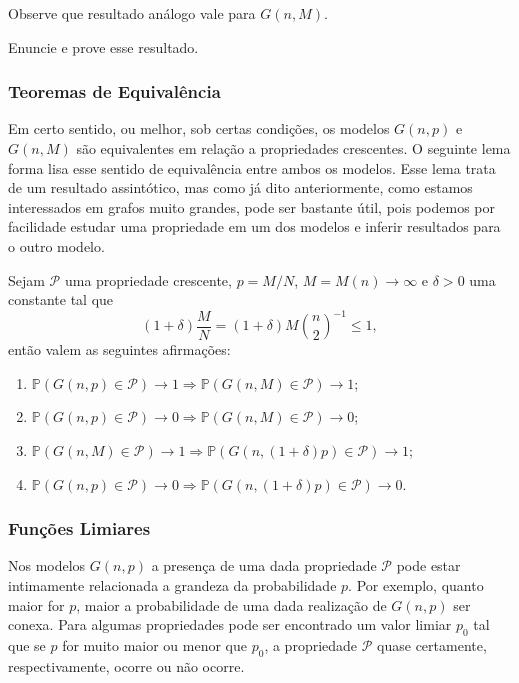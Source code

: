 Observe que resultado análogo vale para $G(n,M)$.
\begin{exercicio}
Enuncie e prove esse resultado.
\end{exercicio}{}

\subsubsection{Teoremas de Equivalência}

Em certo sentido, ou melhor, sob certas condições, os modelos $G(n, p)$ e $G(n, M)$ são equivalentes em relação a propriedades crescentes. O seguinte lema forma lisa esse sentido de equivalência entre ambos os modelos. Esse lema trata de um resultado assintótico, mas como já dito anteriormente, como estamos interessados em grafos muito grandes, pode ser bastante útil, pois podemos por facilidade estudar uma propriedade em um dos modelos e inferir resultados para o outro modelo.

\begin{lema}
Sejam $\mathcal{P}$ uma propriedade crescente, $p = M/ N$, $M = M(n) \rightarrow \infty$ e $\delta > 0$ uma constante tal que 
\begin{equation*}
    (1 + \delta)\frac{M}{N} = (1 + \delta)M\binom{n}{2}^{-1} \leq 1,
\end{equation*}{}
então valem as seguintes afirmações:
\begin{enumerate}
    \item $\mathbb{P}(G(n,p) \in \mathcal{P}) \rightarrow 1 \Rightarrow \mathbb{P}(G(n, M) \in \mathcal{P}) \rightarrow 1$;
    \item $\mathbb{P}(G(n,p) \in \mathcal{P}) \rightarrow 0 \Rightarrow \mathbb{P}(G(n, M) \in \mathcal{P}) \rightarrow 0$;
    \item $\mathbb{P}(G(n,M) \in \mathcal{P}) \rightarrow 1 \Rightarrow \mathbb{P}(G(n, (1 + \delta)p) \in \mathcal{P}) \rightarrow 1$;
    \item $\mathbb{P}(G(n,p) \in \mathcal{P}) \rightarrow 0 \Rightarrow \mathbb{P}(G(n, (1 + \delta)p) \in \mathcal{P}) \rightarrow 0$.
\end{enumerate}
\end{lema}{}
\subsubsection{Funções Limiares}

Nos modelos $G(n, p)$ a presença de uma dada propriedade $\mathcal{P}$ pode estar intimamente relacionada a grandeza da probabilidade $p$. Por exemplo, quanto maior for $p$, maior a probabilidade de uma dada realização de $G(n, p)$ ser conexa. Para algumas propriedades pode ser encontrado um valor limiar $p_0$ tal que se $p$ for muito maior ou menor que $p_0$, a propriedade $\mathcal{P}$ quase certamente, respectivamente, ocorre ou não ocorre.

